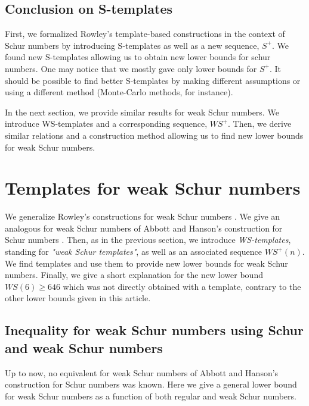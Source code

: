 \documentclass[final,onefignum,onetabnum]{siamart190516}
\newcommand{\WS}{\mathit{WS}}
\begin{document}
\subsection{Conclusion on S-templates}

First, we formalized Rowley's template-based constructions \cite{RowleyRamsey} in the context of Schur numbers 
by introducing S-templates as well as a new sequence, \(S^+\). We found new S-templates allowing us to obtain 
new lower bounds for schur numbers. One may notice that we mostly gave only lower bounds for \(S^+\). It should be possible to 
find better S-templates by making different assumptions or using a different method (Monte-Carlo methods, for instance).

\par
In the next section, we provide similar results for weak Schur numbers. We introduce WS-templates and a corresponding sequence, 
\(\WS^+\). Then, we derive similar relations and a construction method allowing us to find new lower bounds for weak Schur numbers.


\section{Templates for weak Schur numbers}
\label{WeakSchur}

We generalize Rowley's constructions for weak Schur numbers \cite{RowleyWS}. We give an analogous for weak Schur numbers of Abbott 
and Hanson's construction for Schur numbers \cite{AbbottHanson}. Then, as in the previous section, we introduce \textit{WS-templates}, 
standing for \textit{"weak Schur templates"}, as well as an associated sequence \(\WS^+(n)\). We find templates and use them to provide 
new lower bounds for weak Schur numbers. Finally, we give a short explanation for the new lower bound \(\WS(6) \geqslant 646\) which 
was not directly obtained with a template, contrary to the other lower bounds given in this article.

\subsection{Inequality for weak Schur numbers using Schur and weak Schur numbers}

Up to now, no equivalent for weak Schur numbers of Abbott and Hanson's construction for Schur numbers
\cite{AbbottHanson} was known. Here we give a general lower bound for weak Schur numbers as a function of both
regular and weak Schur numbers.
\end{document}
